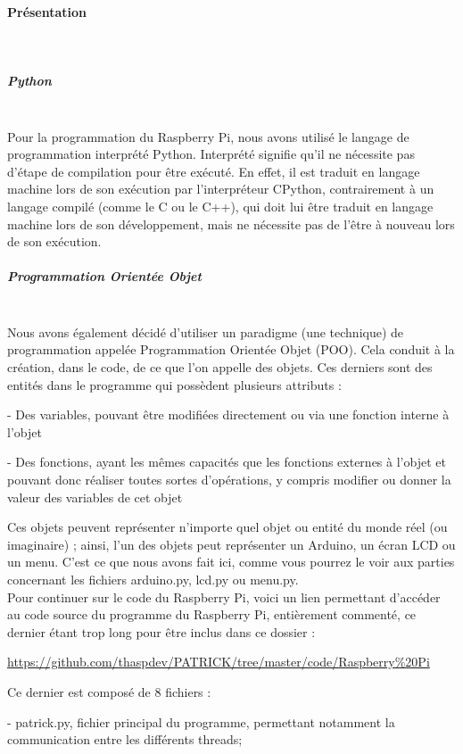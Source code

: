 \documentclass[12pt,a4paper]{article}
\begin{document}
	\paragraph{Présentation}\mbox{}\\
	\subparagraph{Python}\mbox{}\\
\indent\indent Pour la programmation du Raspberry Pi, nous avons utilisé le langage de programmation interprété Python. Interprété signifie qu’il ne nécessite pas d’étape de compilation pour être exécuté. En effet, il est traduit en langage machine lors de son exécution par l’interpréteur CPython, contrairement à un langage compilé (comme le C ou le C++), qui doit lui être traduit en langage machine lors de son développement, mais ne nécessite pas de l'être à nouveau lors de son exécution.

\subparagraph{Programmation Orientée Objet}\mbox{}\\
\indent\indent Nous avons également décidé d’utiliser un paradigme (une technique) de programmation appelée Programmation Orientée Objet (POO). Cela conduit à la création, dans le code, de ce que l'on appelle des objets. Ces derniers sont des entités dans le programme qui possèdent plusieurs attributs :

- Des variables, pouvant être modifiées directement ou via une fonction interne à l'objet

- Des fonctions, ayant les mêmes capacités que les fonctions externes à l'objet et pouvant donc réaliser toutes sortes d'opérations, y compris modifier ou donner la valeur des variables de cet objet

Ces objets peuvent représenter n’importe quel objet ou entité du monde réel (ou imaginaire) ; ainsi, l’un des objets peut représenter un Arduino, un écran LCD ou un menu.
C’est ce que nous avons fait ici, comme vous pourrez le voir aux parties concernant les fichiers arduino.py, lcd.py ou menu.py.\\[0cm]
	
	Pour continuer sur le code du Raspberry Pi, voici un lien permettant d'accéder au code source du programme du Raspberry Pi, entièrement commenté, ce dernier étant trop long pour être inclus dans ce dossier :
	\begin{center}
	\url{https://github.com/thaspdev/PATRICK/tree/master/code/Raspberry\%20Pi}
	\end{center}
	
	Ce dernier est composé de 8 fichiers : 
	
	- patrick.py, fichier principal du programme, permettant notamment la communication entre les différents threads;
	
\end{document}
